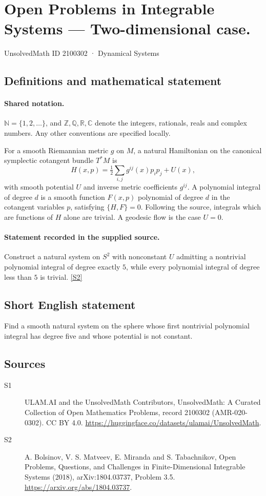 \documentclass[11pt]{article}
\newcommand{\sref}[2]{\hyperlink{source:#1:#2}{[S#2]}}
\begin{document}
\setcounter{section}{2100301}
\section{Open Problems in Integrable Systems — Two-dimensional case.}\label{2100302}
{\small\sffamily UnsolvedMath ID 2100302 · Dynamical Systems}
\subsection{Definitions and mathematical statement}

\paragraph{Shared notation.}$\mathbb N=\{1,2,\ldots\}$, and $\mathbb Z,\mathbb Q,\mathbb R,\mathbb C$ denote the integers, rationals, reals and complex numbers. Any other conventions are specified locally.


For a smooth Riemannian metric $g$ on $M$, a natural Hamiltonian on the canonical symplectic cotangent bundle $T^*M$ is \[H(x,p)=\tfrac12\sum_{i,j}g^{ij}(x)p_ip_j+U(x),\] with smooth potential $U$ and inverse metric coefficients $g^{ij}$. A polynomial integral of degree $d$ is a smooth function $F(x,p)$ polynomial of degree $d$ in the cotangent variables $p$, satisfying $\{H,F\}=0$. Following the source, integrals which are functions of $H$ alone are trivial. A geodesic flow is the case $U=0$.
\paragraph{Statement recorded in the supplied source.}
Construct a natural system on $S^2$ with nonconstant $U$ admitting a nontrivial polynomial integral of degree exactly $5$, while every polynomial integral of degree less than $5$ is trivial. \sref{2100302}{2}
\subsection{Short English statement}
Find a smooth natural system on the sphere whose first nontrivial polynomial integral has degree five and whose potential is not constant.
\subsection{Sources}
\begin{description}
\item[\hypertarget{source:2100302:1}{S1}] ULAM.AI and the UnsolvedMath Contributors, UnsolvedMath: A Curated Collection of Open Mathematics Problems, record 2100302 (AMR-020-0302). CC BY 4.0. \url{https://huggingface.co/datasets/ulamai/UnsolvedMath}.
\item[\hypertarget{source:2100302:2}{S2}] A. Bolsinov, V. S. Matveev, E. Miranda and S. Tabachnikov, Open Problems, Questions, and Challenges in Finite-Dimensional Integrable Systems (2018), arXiv:1804.03737, Problem 3.5. \url{https://arxiv.org/abs/1804.03737}.
\end{description}
\label{end:2100302}
\end{document}
